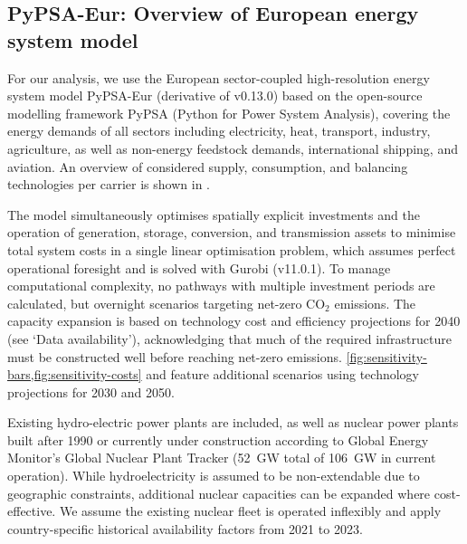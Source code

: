 

\subsection*{PyPSA-Eur: Overview of European energy system model}
\label{sec:methods-overview}

For our analysis, we use the European sector-coupled high-resolution energy
system model PyPSA-Eur\cite{horschPyPSAEurOpen2018a} (derivative of v0.13.0) based on the open-source
modelling framework PyPSA\cite{brownPyPSAPython2018} (Python for Power System
Analysis), covering the energy demands of all sectors including electricity,
heat, transport, industry, agriculture, as well as non-energy feedstock demands,
international shipping, and aviation. An overview of considered supply,
consumption, and balancing technologies per carrier is shown in
.

The model simultaneously optimises spatially explicit investments and the
operation of generation, storage, conversion, and transmission assets to
minimise total system costs in a single linear optimisation problem, which
assumes perfect operational foresight and is solved with Gurobi
(v11.0.1).\cite{gurobi} To manage computational complexity, no pathways with multiple
investment periods are calculated, but overnight scenarios targeting net-zero
CO$_2$ emissions. The capacity expansion is based on technology cost and
efficiency projections for 2040 (see `Data availability'), acknowledging that
much of the required infrastructure must be constructed well before reaching
net-zero emissions. \cref{fig:sensitivity-bars,fig:sensitivity-costs} and
 feature additional scenarios using technology
projections for 2030 and 2050.

Existing hydro-electric power plants\cite{gotzensPerformingEnergy2019} are
included, as well as nuclear power plants built after 1990 or currently under
construction according to Global Energy Monitor's Global Nuclear Plant Tracker
(52~GW total of 106~GW in current
operation).\cite{globalenergymonitorGlobalNuclearPower2024} While
hydroelectricity is assumed to be non-extendable due to geographic constraints,
additional nuclear capacities can be expanded where cost-effective. We assume
the existing nuclear fleet is operated inflexibly and apply country-specific
historical availability factors from 2021 to
2023.\cite{internationalatomicenergyagencyPowerReactorInformation2024}

